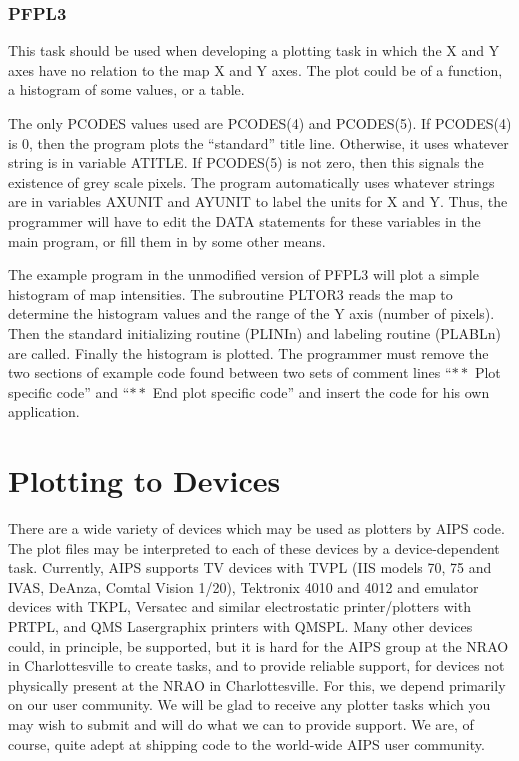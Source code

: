 \subsubsection{PFPL3}
This task should be used when developing a plotting task in which the
X and Y axes have no relation to the map X and Y axes.  The plot could
be of a function, a histogram of some values, or a table.

The only PCODES values used are PCODES(4) and PCODES(5).  If PCODES(4)
is 0, then the program plots the ``standard'' title line.  Otherwise, it
uses whatever string is in variable ATITLE.    If PCODES(5) is not
zero, then this signals the existence of grey scale pixels. The
program automatically uses whatever strings are in variables AXUNIT
and AYUNIT to label the units for X and Y.  Thus, the programmer will
have to edit the DATA statements for these variables in the main
program, or fill them in by some other means.

The example program in the unmodified version of PFPL3 will plot a
simple histogram of map intensities.  The subroutine PLTOR3 reads the
map to determine the histogram values and the range of the Y axis
(number of pixels).  Then the standard initializing routine (PLINIn)
and labeling routine (PLABLn) are called.  Finally the histogram is
plotted.  The programmer must remove the two sections of example code
found between two sets of comment lines ``$\ast\ast$ Plot specific code'' and
``$\ast\ast$ End plot specific code'' and insert the code for his own
application.

\section{Plotting to Devices}
There are a wide variety of devices which may be used as plotters by
AIPS code.  The plot files may be interpreted to each of these devices
by a device-dependent task.  Currently, AIPS supports TV devices with
TVPL (IIS models 70, 75 and IVAS, DeAnza, Comtal Vision 1/20),
Tektronix 4010 and 4012 and emulator devices with TKPL, Versatec and
similar electrostatic printer/plotters with PRTPL, and QMS
Lasergraphix printers with QMSPL.  Many other devices could, in
principle, be supported, but it is hard for the AIPS group at the NRAO in
Charlottesville to create tasks, and to provide reliable support, for
devices not physically present at the NRAO in Charlottesville.  For this, we
depend primarily on our user community.  We will be glad to receive
any plotter tasks which you may wish to submit and will do what we can
to provide support.  We are, of course, quite adept at shipping code
to the world-wide AIPS user community.

